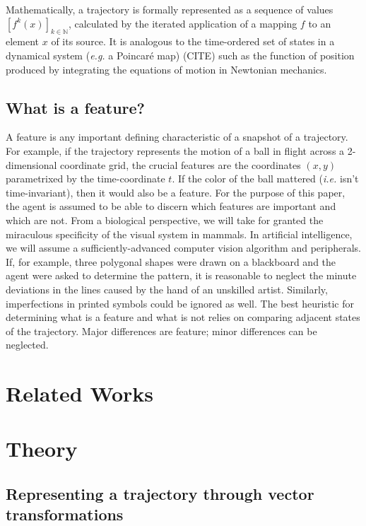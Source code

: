\documentclass{article}
\begin{document}
Mathematically, a trajectory is formally represented as a sequence of values $\left[ f^k(x) \right]_{k \in \mathbb{N}}$,
calculated by the iterated application of a mapping $f$ to an element $x$ of its source.
It is analogous to the time-ordered set of states in a dynamical system (\textit{e.g.} a Poincar\'e map) (CITE)
such as the function of position produced by integrating the equations of motion in Newtonian mechanics.

\subsection{What is a feature?}

A feature is any important defining characteristic of a snapshot of a trajectory.
For example, if the trajectory represents the motion of a ball in flight across a 2-dimensional coordinate grid,
the crucial features are the coordinates $(x, y)$ parametrixed by the time-coordinate $t$.
If the color of the ball mattered (\textit{i.e.} isn't time-invariant), then it would also be a feature.
For the purpose of this paper, the agent is assumed to be able to discern which features are important and which are not.
From a biological perspective, we will take for granted the miraculous specificity of the visual system in mammals.
In artificial intelligence, we will assume a sufficiently-advanced computer vision algorithm and peripherals.
If, for example, three polygonal shapes were drawn on a blackboard and the agent were asked to determine the pattern,
it is reasonable to neglect the minute deviations in the lines caused by the hand of an unskilled artist.
Similarly, imperfections in printed symbols could be ignored as well.
The best heuristic for determining what is a feature and what is not relies on comparing adjacent states of the trajectory.
Major differences are feature; minor differences can be neglected.

\section{Related Works}

\section{Theory}

\subsection{Representing a trajectory through vector transformations}
\label{sec:vectorrepresentation}
\end{document}
